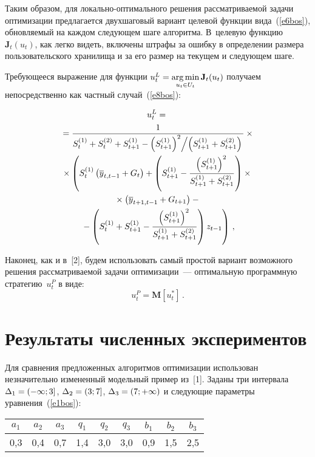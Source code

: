 \begin{multicols}{2}
  Таким образом, для локально-оптимального решения рассматриваемой задачи 
оптимизации предлагается двухшаговый вариант целевой функции вида~(\ref{e6bos}), 
обновляемый на каждом следующем шаге алгоритма. В~целевую 
функцию~$\mathbf{J}_t(u_t)$, как легко видеть, включены штрафы за ошибку в 
определении размера пользовательского хранилища и за его размер на текущем и 
следующем шаге.
  
  Требующееся выражение для функции $u_t^L\hm=\argmin\limits_{u_t\in U_t} 
\mathbf{J}_t(u_t)$ получаем непосредственно как частный случай~(\ref{e8bos}):

\noindent
  \begin{multline}
u_t^L ={}\\
{}= \displaystyle\frac{\displaystyle 1\mathstrut}{\displaystyle S_t^{(1)}+S_t^{(2)}+S_{t+1}^{(1)}-
\left(S_{t+1}^{(1)}\right)^2\!\Big/\!\left(S_{t+1}^{(1)}+S_{t+1}^{(2)}\right)\mathstrut}\times{}\\
{}\times \left( S_t^{(1)}\left( \overline{y}_{t,t-
1}+G_t\right) +
  \left( S_{t+1}^{(1)}-\displaystyle\frac{\displaystyle \left(S_{t+1}^{(1)}\right)^2\mathstrut}{\displaystyle S_{t+1}^{(1)}+S_{t+1}^{(2)}\mathstrut}\right)\times{}\right.\\
  {}\times  \left( 
\overline{y}_{t+1,t-1}+G_{t+1}\right)-{}\\
\left.{}-
  \left( S_t^{(1)}+S_{t+1}^{(1)}-\displaystyle\frac{\displaystyle \left(S_{t+1}^{(1)}\right)^2\mathstrut}{\displaystyle  S_{t+1}^{(1)}+S_{t+1}^{(2)}\mathstrut}\right) 
z_{t-1}\right)\,,
  \label{e9bos}
  \end{multline}
  
  Наконец, как и в~[2], будем использовать самый простой вариант возможного решения 
рассматриваемой задачи оптимизации~--- оптимальную программную стратегию~$u_t^P$ в 
виде:
  \begin{equation}
  u_t^P=\mathbf{M}\left[ u_t^*\right]\,.
  \label{e10bos}
  \end{equation}

\section{Результаты численных экспериментов}
  
  Для сравнения предложенных алгоритмов оптимизации использован незначительно 
измененный модельный пример из~[1]. Заданы три интервала $\Delta_1\hm=(-\infty;3]$, 
$\Delta_2\hm= (3;7]$, $\Delta_3\hm=(7;+\infty)$ и сле\-ду\-ющие параметры 
уравнения~(\ref{e1bos}):


  
  \begin{center}
  \begin{tabular}{|c|c|c|c|c|c|c|c|c|}
  \hline
$a_1$&$a_2$&$a_3$&$q_1$&$q_2$&$q_3$&$b_1$&$b_2$&$b_3$\\
\hline
0,3&0,4&0,7&1,4&3,0&3,0&0,9&1,5&2,5\\
\hline
\end{tabular}
\end{center}


\end{multicols}
